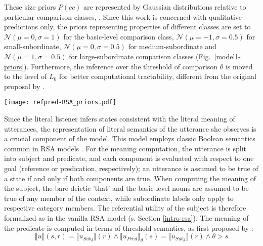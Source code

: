 These size priors $P(cc)$ are represented by Gaussian distributions relative to particular comparison classes, \textcite[as proposed by][]{tessler2017warm}. Since this work is concerned with qualitative predictions only, the priors representing properties of different classes are set to $\mathcal{N}(\mu = 0, \sigma = 1)$ for the basic-level comparison class, $\mathcal{N}(\mu = -1, \sigma = 0.5)$ for small-subordinate, $\mathcal{N}(\mu = 0, \sigma = 0.5)$ for medium-subordinate and $\mathcal{N}(\mu = 1, \sigma = 0.5)$ for large-subordinate comparison classes (Fig.~\ref{model1-priors}). 
Furthermore, the inference over the threshold of comparison $\theta$ is moved to the level of $L_0$ for better computational tractability, different from the original proposal by \textcite{lassiter2013context}.
\begin{figure*}[t]
	\begin{center}
		\texttt{[image: refpred-RSA\_priors.pdf]}
	\end{center}
	\vspace{-0.3cm}
	\caption{Hypothetical prior size distributions over a basic-level, a small-subordinate, a medium-subordinate and a large-subordinate category. These distributions were used for qualitative tests of the refpred-RSA model.}
	\label{model1-priors}
\end{figure*}

Since the literal listener infers states consistent with the literal meaning of utterances, the representation of literal semantics of the utterance she observes is a crucial component of the model. This model employs classic Boolean semantics common in RSA models \parencite{montague1973proper}. For the meaning computation, the utterance is split into subject and predicate, and each component is evaluated with respect to one goal (reference or predication, respectively); an utterance is assumed to be true of a state if and only if both components are true.  When computing the meaning of the subject, the bare deictic 'that' and the basic-level nouns are assumed to be true of any member of the context, while subordinate labels only apply to respective category members. The referential utility of the subject is therefore formalized as in the vanilla RSA model (s. Section \ref{intro-rsa}). The meaning of the predicate is computed in terms of threshold semantics, as first proposed by \textcite{lassiter2013context}: 
\begin{equation}
\llbracket u \rrbracket (s, r) = \llbracket u_{Subj} \rrbracket (r) \land \llbracket u_{Pred} \rrbracket_{\theta} (s) = \llbracket u_{Subj} \rrbracket (r) \land \theta > s
\end{equation}
  
